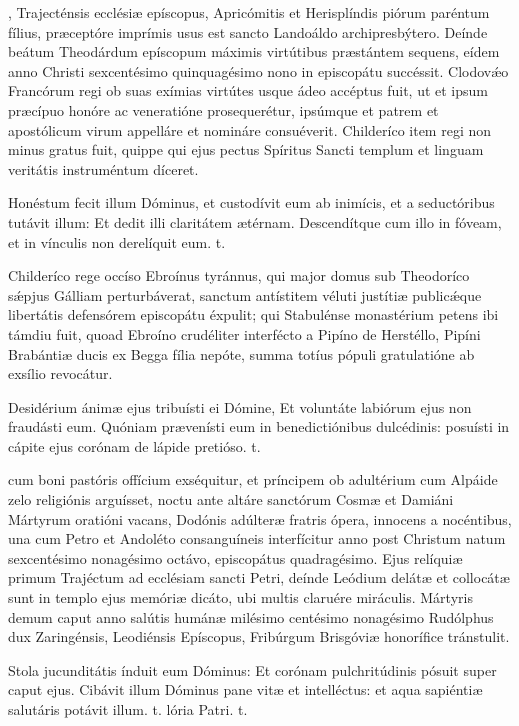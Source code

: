 \documentclass[fontsize=9pt,paper=A6,twoside,BCOR=1mm,DIV=22,headinclude]{scrarticle}
\begin{document}
\begin{multicols}{2}
, Trajecténsis ecclésiæ epíscopus, Apricómitis et Herisplíndis piórum paréntum fílius, præceptóre imprímis usus est sancto Landoáldo archipresbýtero. Deínde beátum Theodárdum epíscopum máximis virtútibus præstántem sequens, eídem anno Christi sexcentésimo quinquagésimo nono in episcopátu succéssit. Clodov\'æo Francórum regi ob suas exímias virtútes usque ádeo accéptus fuit, ut et ipsum præcípuo honóre ac veneratióne prosequerétur, ipsúmque et patrem et apostólicum virum appelláre et nomináre consuéverit. Childeríco item regi non minus gratus fuit, quippe qui ejus pectus Spíritus Sancti templum et linguam veritátis instruméntum díceret.

\R Honéstum fecit illum Dóminus, et custodívit eum ab inimícis, et a seductóribus tutávit illum: \red{*} Et dedit illi claritátem ætérnam.
\V Descendítque cum illo in fóveam, et in vínculis non derelíquit eum. t.

 Childeríco rege occíso Ebroínus tyránnus, qui major domus sub Theodoríco s\'æpjus Gálliam perturbáverat, sanctum antístitem véluti justítiæ public\'æque libertátis defensórem episcopátu éxpulit; qui Stabulénse monastérium petens ibi támdiu fuit, quoad Ebroíno crudéliter interfécto a Pipíno de Herstéllo, Pipíni Brabántiæ ducis ex Begga fília nepóte, summa totíus pópuli gratulatióne ab exsílio revocátur.

\R Desidérium ánimæ ejus tribuísti ei Dómine, \red{*} Et voluntáte labiórum ejus non fraudásti eum.
\V Quóniam prævenísti eum in benedictiónibus dulcédinis: posuísti in cápite ejus corónam de lápide pretióso. t.

 cum boni pastóris offícium exséquitur, et príncipem ob adultérium cum Alpáide zelo religiónis arguísset, noctu ante altáre sanctórum Cosmæ et Damiáni Mártyrum oratióni vacans, Dodónis adúlteræ fratris ópera, innocens a nocéntibus, una cum Petro et Andoléto consanguíneis interfícitur anno post Christum natum sexcentésimo nonagésimo octávo, episcopátus quadragésimo. Ejus relíquiæ primum Trajéctum ad ecclésiam sancti Petri, deínde Leódium delátæ et collocátæ sunt in templo ejus memóriæ dicáto, ubi multis claruére miráculis. Mártyris demum caput anno salútis humánæ milésimo centésimo nonagésimo Rudólphus dux Zaringénsis, Leodiénsis Epíscopus, Fribúrgum Brisgóviæ honorífice tránstulit.

\R Stola jucunditátis índuit eum Dóminus: \red{*} Et corónam pulchritúdinis pósuit super caput ejus.
\V Cibávit illum Dóminus pane vitæ et intelléctus: et aqua sapiéntiæ salutáris potávit illum. t. lória Patri. t.


\end{multicols}
\end{document}
